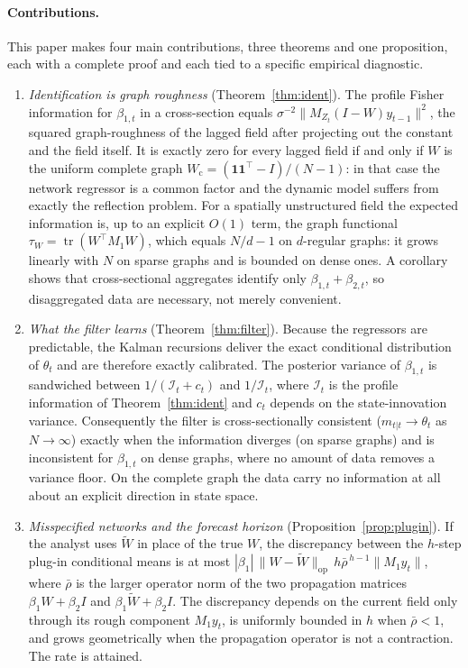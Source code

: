 \documentclass[12pt]{article}
\theoremstyle{plain}
\theoremstyle{definition}
\theoremstyle{remark}
\newcommand{\tr}{\operatorname{tr}}
\newcommand{\one}{\mathbf{1}}
\newcommand{\op}{\mathrm{op}}
\newcommand{\calI}{\mathcal{I}}
\newcommand{\Wc}{W_{\mathrm{c}}}
\newcommand{\tauW}{\tau_W}
\newcommand{\T}{^{\top}}
\begin{document}
\paragraph{Contributions.} This paper makes four main contributions, three theorems and one proposition, each with a complete proof and each tied to a specific empirical diagnostic.

\begin{enumerate}[leftmargin=*,itemsep=1pt]
\item \emph{Identification is graph roughness} (Theorem~\ref{thm:ident}). The profile Fisher information for $\beta_{1,t}$ in a cross-section equals $\sigma^{-2}\|M_{Z_t}(I-W)y_{t-1}\|^2$, the squared graph-roughness of the lagged field after projecting out the constant and the field itself. It is exactly zero for every lagged field if and only if $W$ is the uniform complete graph $\Wc=(\one\one\T-I)/(N-1)$: in that case the network regressor is a common factor and the dynamic model suffers from exactly the reflection problem. For a spatially unstructured field the expected information is, up to an explicit $O(1)$ term, the graph functional $\tauW=\tr(W\T M_1W)$, which equals $N/d-1$ on $d$-regular graphs: it grows linearly with $N$ on sparse graphs and is bounded on dense ones. A corollary shows that cross-sectional aggregates identify only $\beta_{1,t}+\beta_{2,t}$, so disaggregated data are necessary, not merely convenient.

\item \emph{What the filter learns} (Theorem~\ref{thm:filter}). Because the regressors are predictable, the Kalman recursions deliver the exact conditional distribution of $\theta_t$ and are therefore exactly calibrated. The posterior variance of $\beta_{1,t}$ is sandwiched between $1/(\calI_t+c_t)$ and $1/\calI_t$, where $\calI_t$ is the profile information of Theorem~\ref{thm:ident} and $c_t$ depends on the state-innovation variance. Consequently the filter is cross-sectionally consistent ($m_{t|t}\to\theta_t$ as $N\to\infty$) exactly when the information diverges (on sparse graphs) and is inconsistent for $\beta_{1,t}$ on dense graphs, where no amount of data removes a variance floor. On the complete graph the data carry no information at all about an explicit direction in state space.

\item \emph{Misspecified networks and the forecast horizon} (Proposition~\ref{prop:plugin}). If the analyst uses $\widetilde W$ in place of the true $W$, the discrepancy between the $h$-step plug-in conditional means is at most $|\beta_1|\,\|W-\widetilde W\|_{\op}\,h\bar\rho^{\,h-1}\|M_1y_t\|$, where $\bar\rho$ is the larger operator norm of the two propagation matrices $\beta_1W+\beta_2 I$ and $\beta_1\widetilde W+\beta_2 I$. The discrepancy depends on the current field only through its rough component $M_1y_t$, is uniformly bounded in $h$ when $\bar\rho<1$, and grows geometrically when the propagation operator is not a contraction. The rate is attained.


\end{enumerate}
\end{document}
